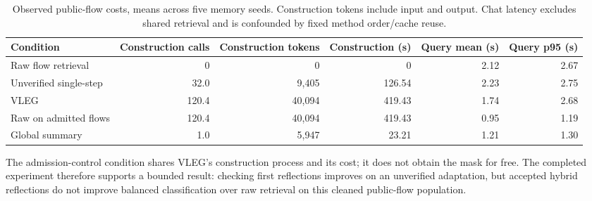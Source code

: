 \begin{table}[!t]
\centering
\caption{Observed public-flow costs, means across five memory seeds. Construction tokens include input and output. Chat latency excludes shared retrieval and is confounded by fixed method order/cache reuse.}
\label{tab:exp6_cost}
\small
\begin{tabular}{lrrrrr}
\toprule
Condition & Construction calls & Construction tokens & Construction (s) & Query mean (s) & Query p95 (s) \\
\midrule
Raw flow retrieval & 0 & 0 & 0 & 2.12 & 2.67 \\
Unverified single-step & 32.0 & 9,405 & 126.54 & 2.23 & 2.75 \\
VLEG & 120.4 & 40,094 & 419.43 & 1.74 & 2.68 \\
Raw on admitted flows & 120.4 & 40,094 & 419.43 & 0.95 & 1.19 \\
Global summary & 1.0 & 5,947 & 23.21 & 1.21 & 1.30 \\
\bottomrule
\end{tabular}
\end{table}
The admission-control condition shares VLEG's construction process and its cost; it does not obtain the mask for free. The completed experiment therefore supports a bounded result: checking first reflections improves on an unverified adaptation, but accepted hybrid reflections do not improve balanced classification over raw retrieval on this cleaned public-flow population.

